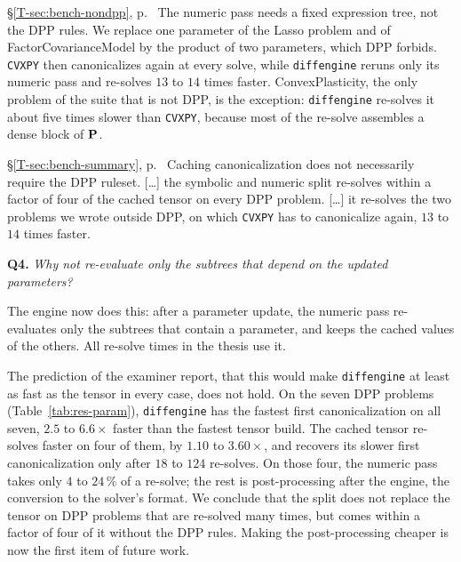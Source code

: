 \documentclass[letterpaper,12pt]{article}
\newcommand{\ac}[1]{#1}
\newcommand{\tsec}[1]{\S\ref{T-#1}}
\newcommand{\tpage}[1]{p.~\pageref{T-#1}}
\newcommand{\tref}[1]{\tsec{#1}, \tpage{#1}}
\newcommand{\question}[2]{\FloatBarrier\par\bigskip\textbf{Q#1.} \emph{#2}\par}
\begin{document}
\begin{thesisquote}{\tref{sec:bench-nondpp}}
The numeric pass needs a fixed expression tree, not the \ac{DPP} rules. We replace one
parameter of the Lasso problem and of FactorCovarianceModel by the product of two parameters,
which \ac{DPP} forbids. \texttt{CVXPY} then canonicalizes again at every solve, while
\texttt{diffengine} reruns only its numeric pass and re-solves $13$ to $14$ times faster.
ConvexPlasticity, the only problem of the suite that is not \ac{DPP}, is the exception:
\texttt{diffengine} re-solves it about five times slower than \texttt{CVXPY}, because most of the
re-solve assembles a dense block of $\mathbf{P}$.
\end{thesisquote}
\begin{thesisquote}{\tref{sec:bench-summary}}
Caching canonicalization does not necessarily require the \ac{DPP} ruleset. [\ldots] the
symbolic and numeric split re-solves within a factor of four of the cached tensor on every
\ac{DPP} problem. [\ldots] it re-solves the two problems we wrote outside \ac{DPP}, on which
\texttt{CVXPY} has to canonicalize again, $13$ to $14$ times faster.
\end{thesisquote}

\question{4}{Why not re-evaluate only the subtrees that depend on the updated parameters?}
The engine now does this: after a parameter update, the numeric pass re-evaluates only the
subtrees that contain a parameter, and keeps the cached values of the others. All re-solve
times in the thesis use it.

The prediction of the examiner report, that this would make \texttt{diffengine} at least as fast as the tensor in every
case, does not hold. On the seven \ac{DPP} problems (Table~\ref{tab:res-param}), \texttt{diffengine} has the fastest
first canonicalization on all seven, $2.5$ to $6.6\times$ faster than the fastest tensor build.
The cached tensor re-solves faster on four of them, by $1.10$ to $3.60\times$, and recovers its
slower first canonicalization only after $18$ to $124$ re-solves. On those four, the numeric
pass takes only $4$ to $24\,\%$ of a re-solve; the rest is post-processing after the engine,
the conversion to the solver's format. We conclude that the split does not replace the
tensor on \ac{DPP} problems that are re-solved many times, but comes within a factor of four of
it without the \ac{DPP} rules. Making the post-processing cheaper is now the first item of
future work.
\end{document}
